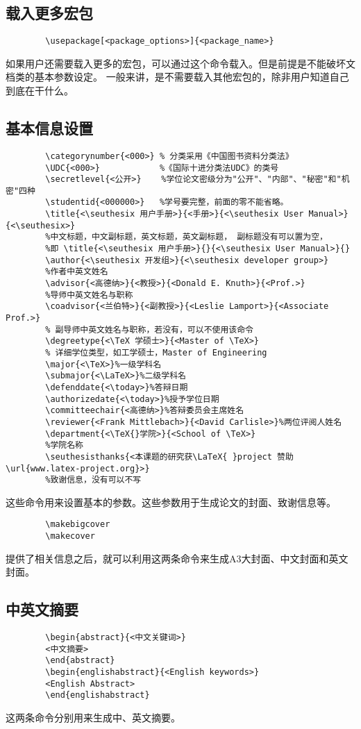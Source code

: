 \documentclass[figurelist,tablelist,algorithmlist,nomlist,masters]{seuthesix}
\begin{document}
	\subsection{载入更多宏包}
	{\color{magenta}
		\begin{verbatim}
		\usepackage[<package_options>]{<package_name>}
		\end{verbatim}
	}
	如果用户还需要载入更多的宏包，可以通过这个命令载入。但是前提是不能破坏\seuthesix 文档类的基本参数设定。
	一般来讲，是不需要载入其他宏包的，除非用户知道自己到底在干什么。
	
	\subsection{基本信息设置}
	{\color{magenta}
		\begin{verbatim}
		\categorynumber{<000>} % 分类采用《中国图书资料分类法》
		\UDC{<000>}            %《国际十进分类法UDC》的类号
		\secretlevel{<公开>}    %学位论文密级分为"公开"、"内部"、"秘密"和"机密"四种
		\studentid{<000000>}   %学号要完整，前面的零不能省略。
		\title{<\seuthesix 用户手册>}{<手册>}{<\seuthesix User Manual>}{<\seuthesix>}
		%中文标题，中文副标题，英文标题，英文副标题， 副标题没有可以置为空， 
		%即 \title{<\seuthesix 用户手册>}{}{<\seuthesix User Manual>}{}
		\author{<\seuthesix 开发组>}{<\seuthesix developer group>}
		%作者中英文姓名
		\advisor{<高德纳>}{<教授>}{<Donald E. Knuth>}{<Prof.>}
		%导师中英文姓名与职称
		\coadvisor{<兰伯特>}{<副教授>}{<Leslie Lamport>}{<Associate Prof.>} 
		% 副导师中英文姓名与职称，若没有，可以不使用该命令
		\degreetype{<\TeX 学硕士>}{<Master of \TeX>} 
		% 详细学位类型，如工学硕士，Master of Engineering
		\major{<\TeX>}%一级学科名
		\submajor{<\LaTeX>}%二级学科名
		\defenddate{<\today>}%答辩日期
		\authorizedate{<\today>}%授予学位日期
		\committeechair{<高德纳>}%答辩委员会主席姓名
		\reviewer{<Frank Mittlebach>}{<David Carlisle>}%两位评阅人姓名
		\department{<\TeX{}学院>}{<School of \TeX>}
		%学院名称
		\seuthesisthanks{<本课题的研究获\LaTeX{ }project 赞助\url{www.latex-project.org}>}
		%致谢信息，没有可以不写
		\end{verbatim}
	}
	这些命令用来设置基本的参数。这些参数用于生成论文的封面、致谢信息等。
	
	
	{\color{magenta}
		\begin{verbatim}
		\makebigcover
		\makecover
		\end{verbatim}
	}
	提供了相关信息之后，就可以利用这两条命令来生成A3大封面、中文封面和英文封面。
	
	
	\subsection{中英文摘要}
	{\color{magenta}
		\begin{verbatim}
		\begin{abstract}{<中文关键词>}
		<中文摘要>
		\end{abstract}
		\begin{englishabstract}{<English keywords>}
		<English Abstract>
		\end{englishabstract}
		\end{verbatim}
	}
	这两条命令分别用来生成中、英文摘要。
	
\end{document}

